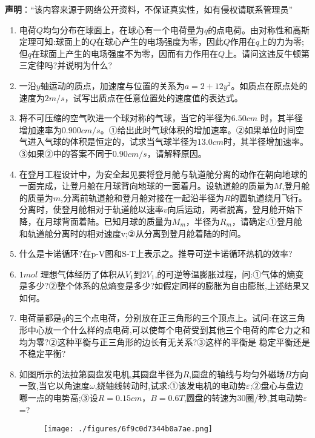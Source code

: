
\textbf{声明}：“该内容来源于网络公开资料，不保证真实性，如有侵权请联系管理员”
\begin{enumerate}
\item 电荷$Q$均匀分布在球面上，在球心有一个电荷量为$q$的点电荷。由对称性和高斯定理可知:球面上的$Q$在球心产生的电场强度为零，因此$Q$作用在$q$上的力为零;但$q$在球面上产生的电场强度不为零，因而有力作用在$Q$上。请问这违反牛顿第三定律吗?并说明为什么?
\item 一沿$y$轴运动的质点，加速度与位置的关系为$a=2+12y^2$。如质点在原点处的速度为$2m/s$，试写出质点在任意位置处的速度值的表达式。
\item 将不可压缩的空气吹进一个球对称的气球，当它的半径为$6.50cm$ 时，其半径增加速率为$0.900cm/s$。①给出此时气球体积的增加速率。②如果单位时间空气进入气球的体积是恒定的，试求当气球半径为$13.0cm$时，其半径增加速率。③如果②中的答案不同于$0.90cm/s$，请解释原因。
\item 在登月工程设计中，为安全起见要将登月舱与轨道舱分离的动作在朝向地球的一面完成，让登月舱在月球背向地球的一面着月。设轨道舱的质量为$M$,登月舱的质量为$m$,分离前轨道舱和登月舱对接在一起沿半径为$R$的圆轨道绕月飞行。分离时，使登月舱相对于轨道舱以速率$v$向后运动，两者脱离，登月舱开始下降，在月球背面着陆。已知月球的质量为$M_m$，半径为$R_m$，请确定:①登月舱和轨道舱分离时的相对速度v;②从分离到登月舱着陆的时间。
\item 什么是卡诺循环?在p-V图和S-T上表示之。推导可逆卡诺循环热机的效率?
\item $ 1mol$ 理想气体经历了体积从$V_1$到$2V_1$,的可逆等温膨胀过程，问:①气体的熵变是多少?②整个体系的总熵变是多少?如假定同样的膨胀为自由膨胀,上述结果又如何。
\item 电荷量都是$q$的三个点电荷，分别放在正三角形的三个顶点上。试问:在这三角形中心放一个什么样的点电荷,可以使每个电荷受到其他三个电荷的库仑力之和均为零?②这种平衡与正三角形的边长有无关系?③这样的平衡是
稳定平衡还是不稳定平衡?
\item 如图所示的法拉第圆盘发电机,其圆盘半径为$R$,圆盘的轴线与均匀外磁场$B$方向一致,当它以角速度$\omega$,绕轴线转动时,试求:①该发电机的电动势$\varepsilon$;②盘心与盘边哪一点的电势高;③设$R=0.15cm$，$B=0.6T$,圆盘的转速为30圈/秒,其电动势$\varepsilon$=?
\begin{figure}[ht]
\centering
\texttt{[image: ./figures/6f9c0d7344b0a7ae.png]}
\caption{} \label{fig_ZKD15_1}
\end{figure}
\end{enumerate}